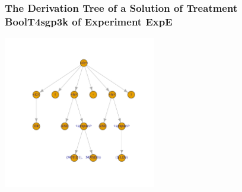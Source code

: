  \begin{frame}
 \frametitle{ The Derivation Tree of a Solution of Treatment BoolT4sgp3k of Experiment ExpE }
 \begin{center}
\includegraphics[width=0.5\textwidth, angle=0]
{ExpEDerivationTreeFigure001.pdf}
 \end{center}
 \label{report/ExpEDerivationTreeFigure001.pdf}  
 \end{frame}

